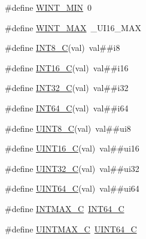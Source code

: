 \begin{DoxyCompactItemize}
\item 
\#define \hyperlink{lib-src_2lv2_2msinttypes_2stdint_8h_a5285bc55170ae1701e599decacc7f001}{W\+I\+N\+T\+\_\+\+M\+IN}~0
\item 
\#define \hyperlink{lib-src_2lv2_2msinttypes_2stdint_8h_ad3f7b6bb8aa7d619017a91d3b2edc1ee}{W\+I\+N\+T\+\_\+\+M\+AX}~\+\_\+\+U\+I16\+\_\+\+M\+AX
\item 
\#define \hyperlink{lib-src_2lv2_2msinttypes_2stdint_8h_acf31df4f42272d793d752c4628c0f195}{I\+N\+T8\+\_\+C}(val)~val\#\#i8
\item 
\#define \hyperlink{lib-src_2lv2_2msinttypes_2stdint_8h_ab8c7ef9b034497b6cbd51a82eb22943b}{I\+N\+T16\+\_\+C}(val)~val\#\#i16
\item 
\#define \hyperlink{lib-src_2lv2_2msinttypes_2stdint_8h_a7df71d27f096826a76677178823f39bb}{I\+N\+T32\+\_\+C}(val)~val\#\#i32
\item 
\#define \hyperlink{lib-src_2lv2_2msinttypes_2stdint_8h_a095799ae3fe39d90cfbbe21ad4713318}{I\+N\+T64\+\_\+C}(val)~val\#\#i64
\item 
\#define \hyperlink{lib-src_2lv2_2msinttypes_2stdint_8h_a8caaafb4382e3c415f261b6580f0929d}{U\+I\+N\+T8\+\_\+C}(val)~val\#\#ui8
\item 
\#define \hyperlink{lib-src_2lv2_2msinttypes_2stdint_8h_ac8ab4bd1a0343acea9b7ed3e05c5ad13}{U\+I\+N\+T16\+\_\+C}(val)~val\#\#ui16
\item 
\#define \hyperlink{lib-src_2lv2_2msinttypes_2stdint_8h_a189f825ef34a1be844d384db2618ce12}{U\+I\+N\+T32\+\_\+C}(val)~val\#\#ui32
\item 
\#define \hyperlink{lib-src_2lv2_2msinttypes_2stdint_8h_a8da5373e041921aa34c2b6172ac3babc}{U\+I\+N\+T64\+\_\+C}(val)~val\#\#ui64
\item 
\#define \hyperlink{lib-src_2lv2_2msinttypes_2stdint_8h_ad558c804c227da1f8e1844e5314e80c5}{I\+N\+T\+M\+A\+X\+\_\+C}~\hyperlink{win_2_l_a_d_s_p_a__plugins-win_2glibc__includes_2stdint_8h_a22369e5d04efcda4162fdb0f5759318e}{I\+N\+T64\+\_\+C}
\item 
\#define \hyperlink{lib-src_2lv2_2msinttypes_2stdint_8h_ad7d1c8e3d3b8ba6eed942f6f7a0910db}{U\+I\+N\+T\+M\+A\+X\+\_\+C}~\hyperlink{win_2_l_a_d_s_p_a__plugins-win_2glibc__includes_2stdint_8h_a26a7bac63d90ef61175acb9f6fc4f2ca}{U\+I\+N\+T64\+\_\+C}
\end{DoxyCompactItemize}
